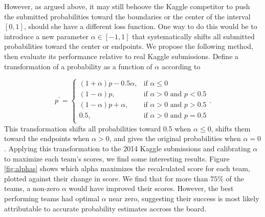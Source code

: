 \documentclass[11pt]{article} %
\begin{document}
However, as argued above, it may still behoove the Kaggle competitor to push the submitted probabilities toward the boundaries or the center of the interval $[0,1]$, should she have a different loss function. One way to do this would be to introduce a new parameter $\alpha \in [-1,1]$ that systematically shifts all submitted probabilities toward the center or endpoints. We propose the following method, then evaluate its performance relative to real Kaggle submissions. Define a transformation of a probability as a function of $\alpha$ according to

$$
p^\prime= \left\{ \begin{array}{lr} 
			(1+\alpha)p - 0.5\alpha, & \mbox{if $\alpha \le 0$} \\
			(1-\alpha)p, & \mbox{if $\alpha >0$ and $p < 0.5$} \\
			(1-\alpha)p + \alpha, & \mbox{if $\alpha >0$ and $p > 0.5$} \\
			0.5,  & \mbox{if $\alpha >0$ and $p = 0.5$} \\
		   \end{array} \right. . 
$$
This transformation shifts all probabilities toward 0.5 when $\alpha \le 0$, shifts them toward the endpoints when $\alpha>0$, and gives the original probabilities when $\alpha=0$.  
Applying this transformation to the 2014 Kaggle submissions and calibrating $\alpha$ to maximize each team's scores, we find some interesting results. Figure \ref{fig:alphas} shows which alpha maximizes the recalculated score for each team, plotted against their change in score. We find that for more than $75\%$ of the teams, a non-zero $\alpha$ would have improved their scores. However, the best performing teams had optimal $\alpha$ near zero, suggesting their success is most likely attributable to accurate probability estimates accross the board.
\end{document}
